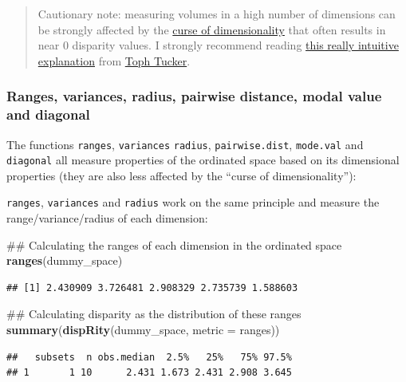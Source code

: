 \documentclass[]{book}
\newenvironment{Shaded}{\begin{snugshade}}{\end{snugshade}}
\newcommand{\KeywordTok}[1]{\textcolor[rgb]{0.13,0.29,0.53}{\textbf{#1}}}
\newcommand{\DataTypeTok}[1]{\textcolor[rgb]{0.13,0.29,0.53}{#1}}
\newcommand{\NormalTok}[1]{#1}
\theoremstyle{definition}
\theoremstyle{definition}
\theoremstyle{remark}
\begin{document}
\begin{quote}
Cautionary note: measuring volumes in a high number of dimensions can be
strongly affected by the
\href{https://en.wikipedia.org/wiki/Curse_of_dimensionality}{curse of
dimensionality} that often results in near 0 disparity values. I
strongly recommend reading
\href{https://beta.observablehq.com/@tophtucker/theres-plenty-of-room-in-the-corners}{this
really intuitive explanation} from
\href{https://github.com/tophtucker}{Toph Tucker}.
\end{quote}

\subsubsection{Ranges, variances, radius, pairwise distance, modal value
and
diagonal}\label{ranges-variances-radius-pairwise-distance-modal-value-and-diagonal}

The functions \texttt{ranges}, \texttt{variances} \texttt{radius},
\texttt{pairwise.dist}, \texttt{mode.val} and \texttt{diagonal} all
measure properties of the ordinated space based on its dimensional
properties (they are also less affected by the ``curse of
dimensionality''):

\texttt{ranges}, \texttt{variances} and \texttt{radius} work on the same
principle and measure the range/variance/radius of each dimension:

\begin{Shaded}
\begin{Highlighting}[]
\NormalTok{## Calculating the ranges of each dimension in the ordinated space}
\KeywordTok{ranges}\NormalTok{(dummy_space)}
\end{Highlighting}
\end{Shaded}

\begin{verbatim}
## [1] 2.430909 3.726481 2.908329 2.735739 1.588603
\end{verbatim}

\begin{Shaded}
\begin{Highlighting}[]
\NormalTok{## Calculating disparity as the distribution of these ranges}
\KeywordTok{summary}\NormalTok{(}\KeywordTok{dispRity}\NormalTok{(dummy_space, }\DataTypeTok{metric =}\NormalTok{ ranges))}
\end{Highlighting}
\end{Shaded}

\begin{verbatim}
##   subsets  n obs.median  2.5%   25%   75% 97.5%
## 1       1 10      2.431 1.673 2.431 2.908 3.645
\end{verbatim}
\end{document}
